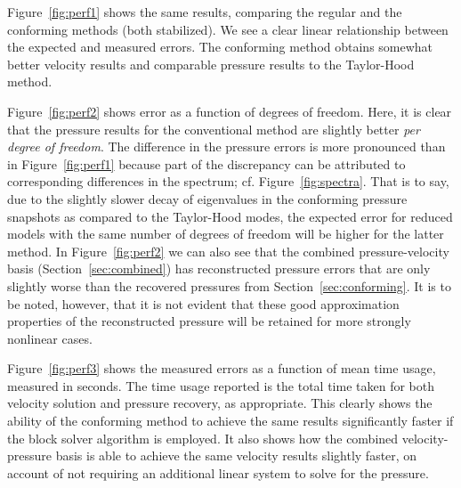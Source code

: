 \documentclass[onecolumn, twoside, a4paper, 11pt]{article}
\begin{document}
Figure~\ref{fig:perf1} shows the same results, comparing the regular and the conforming methods
(both stabilized). We see a clear linear relationship between the expected and measured errors. The
conforming method obtains somewhat better velocity results and comparable pressure results to the
Taylor-Hood method.

Figure~\ref{fig:perf2} shows error as a function of degrees of freedom. Here, it is clear that the
pressure results for the conventional method are slightly better \emph{per degree of freedom}. The
difference in the pressure errors is more pronounced than in Figure~\ref{fig:perf1} because part
of the discrepancy can be attributed to corresponding differences in the spectrum; cf. Figure~\ref{fig:spectra}.
That is to say, due to the slightly slower decay
of eigenvalues in the conforming pressure snapshots as compared to the Taylor-Hood modes, the
expected error for reduced models with the same number of degrees of freedom will be higher for the
latter method.
In Figure~\ref{fig:perf2} we can also see that the combined pressure-velocity basis
(Section~\ref{sec:combined}) has reconstructed pressure errors that are only slightly worse than the
recovered pressures from Section~\ref{sec:conforming}. It is to be noted, however, that it is not
evident that these good approximation properties of the reconstructed pressure will be retained for
more strongly nonlinear cases.

Figure~\ref{fig:perf3} shows the measured errors as a function of mean time usage, measured in
seconds. The time usage reported is the total time taken for both velocity solution and pressure
recovery, as appropriate.
This clearly shows the ability of the conforming method to achieve the same results significantly
faster if the block solver algorithm is employed. It also shows how the combined velocity-pressure
basis is able to achieve the same velocity results slightly faster, on account of not requiring an
additional linear system to solve for the pressure.
\end{document}
